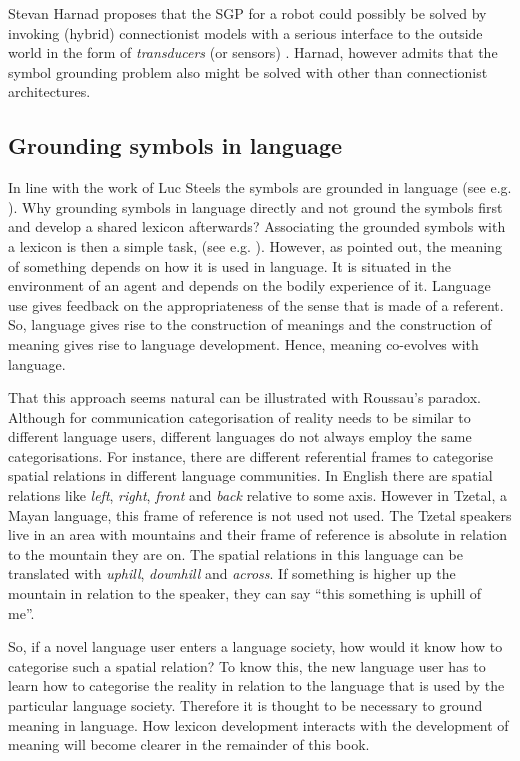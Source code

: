  Stevan Harnad proposes that the SGP for a robot could possibly be solved by invoking (hybrid) connectionist models with a serious interface to the outside world in the form of {\em transducers} (or sensors) \citep{harnad:1993}. Harnad, however admits that the symbol grounding problem also might be solved with other than connectionist architectures.

\subsection{Grounding symbols in language}

In line with the work of Luc Steels the symbols are grounded in language (see e.g. \citealt{steels:1997a,steels:2000}). Why grounding symbols in language directly and not ground the symbols first and develop a shared lexicon afterwards? Associating the grounded symbols with a lexicon is then a simple task, (see e.g. \citealt{oliphant:1997,steels:1996a}). However, as \citet{wittgenstein:1958} pointed out, the meaning of something depends on how it is used in language. It is situated in the environment of an agent and depends on the bodily experience of it. Language use gives feedback on the appropriateness of the sense that is made of a referent. So, language gives rise to the construction of meanings and the construction of meaning gives rise to language development. Hence, meaning co-evolves with language.

That this approach seems natural can be illustrated with Roussau's paradox. Although for communication categorisation of reality needs to be similar to different language users, different languages do not always employ the same categorisations. For instance, there are different referential frames to categorise spatial relations in different language communities. In English there are spatial relations like {\em left}, {\em right}, {\em front} and {\em back} relative to some axis. However in Tzetal, a Mayan language, this frame of reference is not used not used. The Tzetal speakers live in an area with mountains and their frame of reference is absolute in relation to the mountain they are on. The spatial relations in this language can be translated with {\em uphill}, {\em downhill} and {\em across}. If something is higher up the mountain in relation to the speaker, they can say ``this something is uphill of me''.

So, if a novel language user enters a language society, how would it know how to categorise such a spatial relation? To know this, the new language user has to learn how to categorise the reality in relation to the language that is used by the particular language society. Therefore it is thought to be necessary to ground meaning in language. How lexicon development interacts with the development of meaning will become clearer in the remainder of this book.


